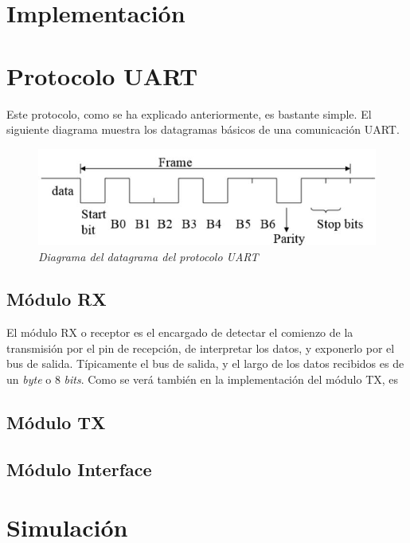 \documentclass{article}
\begin{document}
\newpage
\section{Implementación}

\newpage
\section{Protocolo UART}
\indent Este protocolo, como se ha explicado anteriormente, es bastante simple. El siguiente diagrama muestra los 
datagramas básicos de una comunicación UART.

\begin{figure}[H]
    \includegraphics[scale=0.5]{protocol}
    \caption{\textit{Diagrama del datagrama del protocolo UART}}
\end{figure}

\subsection{Módulo RX}
\indent El módulo RX o receptor es el encargado de detectar el comienzo de la transmisión por el pin de recepción,
de interpretar los datos, y exponerlo por el bus de salida. Típicamente el bus de salida, y el largo de los datos recibidos
es de un \textit{byte} o 8 \textit{bits}.
\indent Como se verá también en la implementación del módulo TX, es 

\subsection{Módulo TX}



\subsection{Módulo Interface}

	

\newpage
\section{Simulación}
\end{document}
